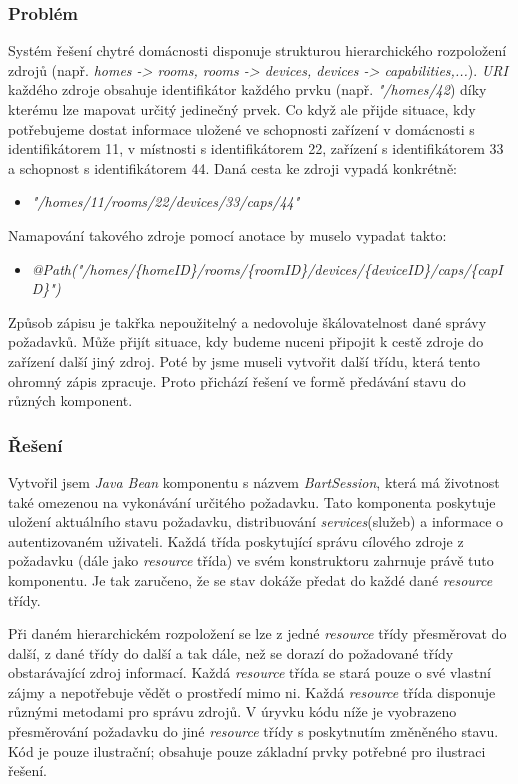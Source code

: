 \subsubsection*{Problém}
Systém řešení chytré domácnosti disponuje strukturou hierarchického rozpoložení zdrojů (např. \emph{homes -> rooms, rooms -> devices, devices -> capabilities,...}).
\emph{URI} každého zdroje obsahuje identifikátor každého prvku (např. \emph{"/homes/42}) díky kterému lze mapovat určitý jedinečný prvek.
Co když ale přijde situace, kdy potřebujeme dostat informace uložené ve schopnosti zařízení v domácnosti s identifikátorem 11, v místnosti s identifikátorem 22, zařízení s identifikátorem 33 a schopnost s identifikátorem 44.
\newline
Daná cesta ke zdroji vypadá konkrétně:
\begin{itemize}
  \item \emph{"/homes/11/rooms/22/devices/33/caps/44"}
\end{itemize}

Namapování takového zdroje pomocí anotace  by muselo vypadat takto:
\begin{itemize}
  \item \emph{@Path("/homes/\{homeID\}/rooms/\{roomID\}/devices/\{deviceID\}/caps/\{capID\}")}
\end{itemize}

Způsob zápisu je takřka nepoužitelný a nedovoluje škálovatelnost dané správy požadavků.
Může přijít situace, kdy budeme nuceni připojit k cestě zdroje do zařízení další jiný zdroj.
Poté by jsme museli vytvořit další třídu, která tento ohromný zápis zpracuje.
Proto přichází řešení ve formě předávání stavu do různých komponent.

\subsubsection*{Řešení}
Vytvořil jsem \emph{Java Bean} komponentu s názvem \emph{BartSession}, která má životnost také omezenou na vykonávání určitého požadavku.
Tato komponenta poskytuje uložení aktuálního stavu požadavku, distribuování \emph{services}(služeb) a informace o autentizovaném uživateli.
Každá třída poskytující správu cílového zdroje z požadavku (dále jako \emph{resource} třída) ve svém konstruktoru zahrnuje právě tuto komponentu.
Je tak zaručeno, že se stav dokáže předat do každé dané \emph{resource} třídy.

Při daném hierarchickém rozpoložení se lze z jedné \emph{resource} třídy přesměrovat do další, z dané třídy do další a tak dále, než se dorazí do požadované třídy obstarávající zdroj informací.
Každá \emph{resource} třída se stará pouze o své vlastní zájmy a nepotřebuje vědět o prostředí mimo ni.
Každá \emph{resource} třída disponuje různými metodami pro správu zdrojů.
V úryvku kódu níže je vyobrazeno přesměrování požadavku do jiné \emph{resource} třídy s poskytnutím změněného stavu.
Kód je pouze ilustrační; obsahuje pouze základní prvky potřebné pro ilustraci řešení.

